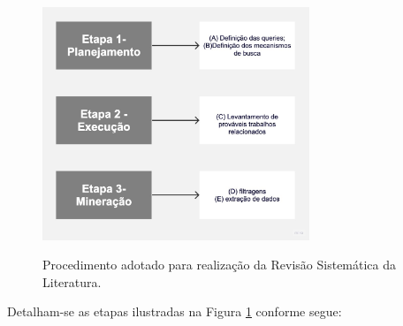 \begin{figure}[H]
\centering
\caption{Procedimento adotado para realização da Revisão Sistemática da Literatura.} \includegraphics[width=8cm,height=\textwidth,keepaspectratio]{2-images/Fluxograma-artigos.jpg}
\newline {}\label{fig:processo_rev_sistematica}
\end{figure}


Detalham-se as etapas ilustradas na Figura \ref{fig:processo_rev_sistematica} conforme segue:

